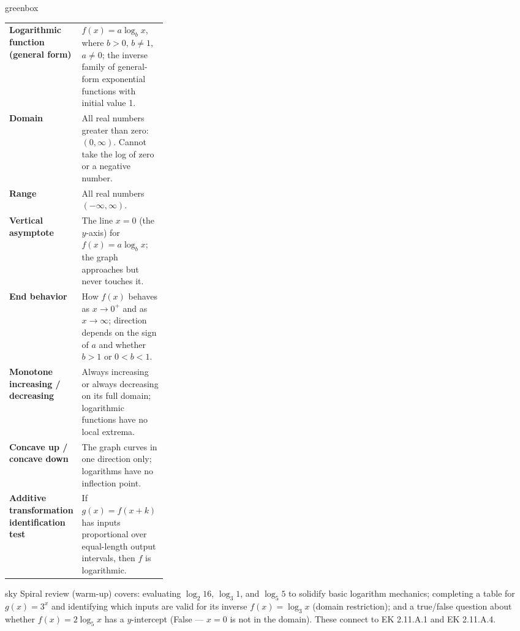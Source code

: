 \documentclass[10pt]{article}
\begin{document}
\begin{skillbox}{greenbox}
\renewcommand{\arraystretch}{1.4}
\begin{tabularx}{\linewidth}{@{} >{\leavevmode\bfseries\color{navy}}p{0.30\linewidth} X @{}}
Logarithmic function (general form) & $f(x) = a\log_b x$, where $b>0$, $b\ne1$, $a\ne0$;
                                      the inverse family of general-form exponential functions
                                      with initial value 1. \\
Domain & All real numbers greater than zero: $(0, \infty)$.
         Cannot take the log of zero or a negative number. \\
Range & All real numbers $(-\infty, \infty)$. \\
Vertical asymptote & The line $x = 0$ (the $y$-axis) for $f(x) = a\log_b x$;
                     the graph approaches but never touches it. \\
End behavior & How $f(x)$ behaves as $x\to 0^+$ and as $x\to\infty$;
               direction depends on the sign of $a$ and whether $b>1$ or $0<b<1$. \\
Monotone increasing / decreasing & Always increasing or always decreasing on its full domain;
                                   logarithmic functions have no local extrema. \\
Concave up / concave down & The graph curves in one direction only; logarithms have no
                            inflection point. \\
Additive transformation identification test & If $g(x) = f(x+k)$ has inputs proportional over
                            equal-length output intervals, then $f$ is logarithmic. \\
\end{tabularx}
\end{skillbox}

\begin{skillbox}{sky}
    Spiral review (warm-up) covers: evaluating $\log_2 16$, $\log_3 1$, and $\log_5 5$ to
    solidify basic logarithm mechanics; completing a table for $g(x) = 3^x$ and identifying
    which inputs are valid for its inverse $f(x) = \log_3 x$ (domain restriction); and a
    true/false question about whether $f(x) = 2\log_5 x$ has a $y$-intercept (False ---
    $x = 0$ is not in the domain). These connect to EK 2.11.A.1 and EK 2.11.A.4.
\end{skillbox}
\end{document}
